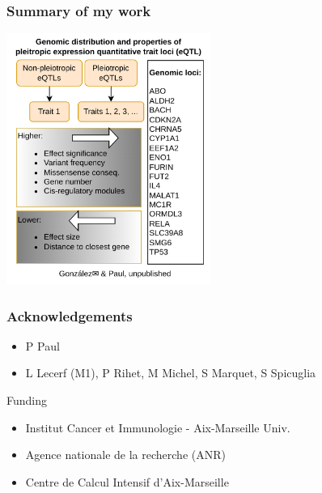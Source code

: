 \documentclass{beamer}
\begin{document}
    \begin{frame}
        \frametitle{Summary of my work}

        \begin{center}
            \includegraphics[width=0.5\textwidth]{fig/graphical_abstract.drawio.png}
        \end{center}

    \end{frame}

    \begin{frame}
        \frametitle{Acknowledgements}

        \begin{itemize}
            \item P Paul
            \item L Lecerf (M1), P Rihet, M Michel, S Marquet, S Spicuglia
        \end{itemize}
%
        \vfill
%
        Funding
%
        \begin{itemize}
            \item Institut Cancer et Immunologie - Aix-Marseille Univ.
            \item Agence nationale de la recherche (ANR)
            \item Centre de Calcul Intensif d'Aix-Marseille
        \end{itemize}

    \end{frame}
\end{document}
